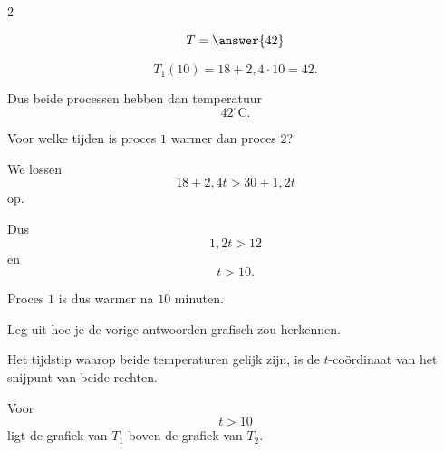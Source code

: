 \documentclass{ximera}
\begin{document}
\begin{oefening}{\oefG}
\begin{multicols}{2}
\begin{question}
    \[
    T=\answer{42}
    \]
    
    \begin{oplossing}
    \[
    T_1(10)
    =18+2{,}4\cdot10
    =42.
    \]
    
    Dus beide processen hebben dan temperatuur
    \[
    42^\circ\mathrm C.
    \]
    \end{oplossing}
    \end{question}
    
    
    \begin{question}
    Voor welke tijden is proces $1$ warmer dan proces $2$?
    
    \begin{oplossing}
    We lossen
    \[
    18+2{,}4t
    >
    30+1{,}2t
    \]
    op.
    
    Dus
    \[
    1{,}2t>12
    \]
    en
    \[
    t>10.
    \]
    
    Proces $1$ is dus warmer na $10$ minuten.
    \end{oplossing}
    \end{question}
    
    
    \begin{question}
    Leg uit hoe je de vorige antwoorden grafisch zou herkennen.
    
    \begin{oplossing}
    Het tijdstip waarop beide temperaturen gelijk zijn, is de $t$-coördinaat van het snijpunt van beide rechten.
    
    Voor
    \[
    t>10
    \]
    ligt de grafiek van $T_1$ boven de grafiek van $T_2$.
    \end{oplossing}
    \end{question}
    
    \end{multicols}
    
    \end{oefening}
    
    
\end{document}
